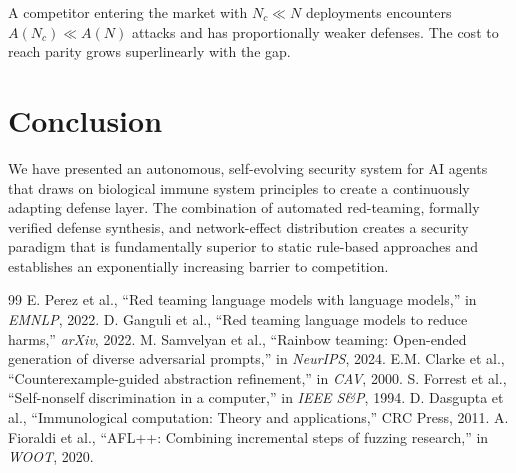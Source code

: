 \documentclass[conference]{IEEEtran}
\begin{document}
A competitor entering the market with $N_c \ll N$ deployments encounters $A(N_c) \ll A(N)$ attacks and has proportionally weaker defenses. The cost to reach parity grows superlinearly with the gap.

\section{Conclusion}

We have presented an autonomous, self-evolving security system for AI agents that draws on biological immune system principles to create a continuously adapting defense layer. The combination of automated red-teaming, formally verified defense synthesis, and network-effect distribution creates a security paradigm that is fundamentally superior to static rule-based approaches and establishes an exponentially increasing barrier to competition.

\begin{thebibliography}{99}
 E. Perez et al., ``Red teaming language models with language models,'' in \textit{EMNLP}, 2022.
 D. Ganguli et al., ``Red teaming language models to reduce harms,'' \textit{arXiv}, 2022.
 M. Samvelyan et al., ``Rainbow teaming: Open-ended generation of diverse adversarial prompts,'' in \textit{NeurIPS}, 2024.
 E.M. Clarke et al., ``Counterexample-guided abstraction refinement,'' in \textit{CAV}, 2000.
 S. Forrest et al., ``Self-nonself discrimination in a computer,'' in \textit{IEEE S\&P}, 1994.
 D. Dasgupta et al., ``Immunological computation: Theory and applications,'' CRC Press, 2011.
 A. Fioraldi et al., ``AFL++: Combining incremental steps of fuzzing research,'' in \textit{WOOT}, 2020.
\end{thebibliography}
\end{document}
